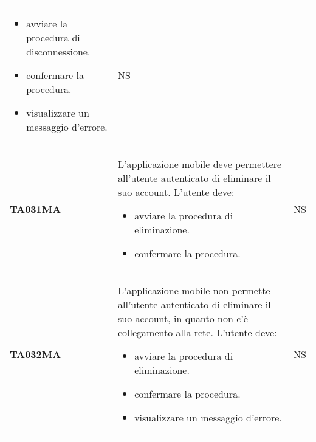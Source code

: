 \documentclass[../piano-di-qualifica.tex]{subfiles}
\begin{document}
\begin{longtable}[H]{>{\centering\bfseries}m{3cm} >{}m{10cm} >{\centering\arraybackslash}m{3cm}}
\begin{itemize}
    \item avviare la procedura di disconnessione.
    \item confermare la procedura.
    \item visualizzare un messaggio d'errore.
  \end{itemize}
                    & NS                                                                                                                                                                                                                                                               \\
  TA031MA           & L'applicazione mobile deve permettere all'utente autenticato di eliminare il suo account. \newline
  L'utente deve:
  \begin{itemize}
    \item avviare la procedura di eliminazione.
    \item confermare la procedura.
  \end{itemize}
                    & NS                                                                                                                                                                                                                                                               \\
  TA032MA           & L'applicazione mobile non permette all'utente autenticato di eliminare il suo account, in quanto non c'è collegamento alla rete. \newline
  L'utente deve:
  \begin{itemize}
    \item avviare la procedura di eliminazione.
    \item confermare la procedura.
    \item visualizzare un messaggio d'errore.
  \end{itemize}
                    & NS                                                                                                                                                                                                                                                               \\



\end{longtable}
\end{document}
